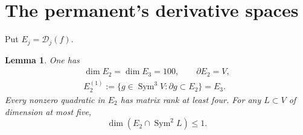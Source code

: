 \documentclass[11pt]{amsart}
\newtheorem{lemma}[theorem]{Lemma}
\theoremstyle{remark}
\numberwithin{equation}{section}
\newcommand{\Sym}{\operatorname{Sym}}
\newcommand{\cD}{\mathcal D}
\newcommand{\dd}{\partial}
\begin{document}
\section{The permanent's derivative spaces}
Put \(E_j=\cD_j(f)\).
\begin{lemma}\label{lem:permanent}
One has
\[
 \begin{gathered}
 \dim E_2=\dim E_3=100,\qquad \dd E_2=V,\\
 E_2^{(1)}:=\{g\in\Sym^3V:\dd g\subset E_2\}=E_3.
 \end{gathered}
\]
Every nonzero quadratic in \(E_2\) has matrix rank at least four. For
any \(L\subset V\) of dimension at most five,
\begin{equation}\label{eq:intersection}
 \dim(E_2\cap\Sym^2L)\le1.
\end{equation}
\end{lemma}
\end{document}
